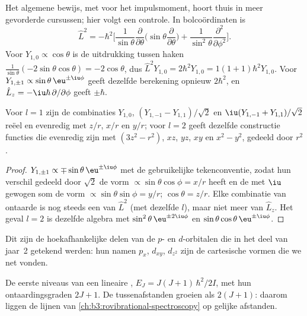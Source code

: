 Het algemene bewijs, met  voor het impulsmoment, hoort
thuis in meer gevorderde cursussen; hier volgt een controle. In
bolcoördinaten is
\[
\hat L^2 = -\hbar^2\Big[\frac{1}{\sin\theta}\frac{\partial}{\partial\theta}
\Big(\sin\theta\frac{\partial}{\partial\theta}\Big) +
\frac{1}{\sin^2\theta}\frac{\partial^2}{\partial\phi^2}\Big].
\]
Voor $Y_{1,0} \propto \cos\theta$ is de uitdrukking tussen haken $\frac{1}{\sin\theta}(-2\sin\theta
\cos\theta) = -2\cos\theta$, dus $\hat L^2Y_{1,0} = 2\hbar^2Y_{1,0} = 1(1+1)\hbar^2
Y_{1,0}$. Voor $Y_{1,\pm1} \propto \sin\theta\,\eu^{\pm\iu\phi}$ geeft
dezelfde berekening opnieuw $2\hbar^2$, en $\hat L_z = -\iu\hbar\,\partial/\partial
\phi$ geeft $\pm\hbar$.

\begin{proposition}\label{prop:b3:quantum-model-systems:real-harmonics}
Voor $l = 1$ zijn de combinaties $Y_{1,0}$, $(Y_{1,-1} - Y_{1,1})/\sqrt2$ en
$\iu(Y_{1,-1} + Y_{1,1})/\sqrt2$ reëel en evenredig met $z/r$, $x/r$ en
$y/r$; voor $l = 2$ geeft dezelfde constructie functies die evenredig zijn
met $(3z^2 - r^2)$, $xz$, $yz$, $xy$ en $x^2 - y^2$, gedeeld door $r^2$.
\end{proposition}

\begin{proof}
$Y_{1,\pm1} \propto \mp\sin\theta\,\eu^{\pm\iu\phi}$ met de gebruikelijke
tekenconventie, zodat hun verschil gedeeld door $\sqrt2$ de vorm $\propto\sin\theta\cos\phi =
x/r$ heeft en de met $\iu$ gewogen som de vorm $\propto\sin\theta\sin\phi = y/r$;
$\cos\theta = z/r$. Elke combinatie van ontaarde  is nog
steeds een  van $\hat L^2$ (met dezelfde $l$), maar niet meer van $\hat
L_z$. Het geval $l = 2$ is dezelfde algebra met $\sin^2\theta\,\eu^{\pm2\iu\phi}$
en $\sin\theta\cos\theta\,\eu^{\pm\iu\phi}$.
\end{proof}

Dit zijn de hoekafhankelijke delen van de $p$- en $d$-orbitalen die in het
deel van jaar~2
getekend werden: hun namen $p_x$, $d_{xy}$, $d_{z^2}$ zijn de cartesische
vormen die we net vonden.

\begin{omfigure}

{\small De eerste niveaus van een lineaire , $E_J = J(J+1)\,\hbar^2/2I$,
met hun ontaardingsgraden $2J + 1$. De tussenafstanden groeien als
$2(J+1)$: daarom liggen de lijnen van
\cref{ch:b3:rovibrational-spectroscopy} op gelijke afstanden.}
\end{omfigure}


